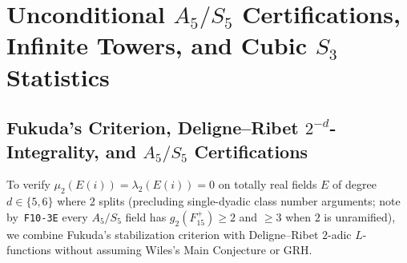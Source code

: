 \section{Unconditional $A_5/S_5$ Certifications, Infinite Towers, and Cubic $S_3$ Statistics}\label{sec:4:a5s3}

\subsection{Fukuda's Criterion, Deligne--Ribet $2^{-d}$-Integrality, and $A_5/S_5$ Certifications}\label{sec:4:a5}

To verify $\mu_2(E(i)) = \lambda_2(E(i)) = 0$ on totally real fields $E$ of degree $d \in \{5, 6\}$ where $2$ splits (precluding single-dyadic class number arguments; note by~\texttt{F10-3E} every $A_5/S_5$ field has $g_2(F_{15}^+) \ge 2$ and $\ge 3$ when $2$ is unramified), we combine Fukuda's stabilization criterion with Deligne--Ribet $2$-adic $L$-functions without assuming Wiles's Main Conjecture or GRH.

